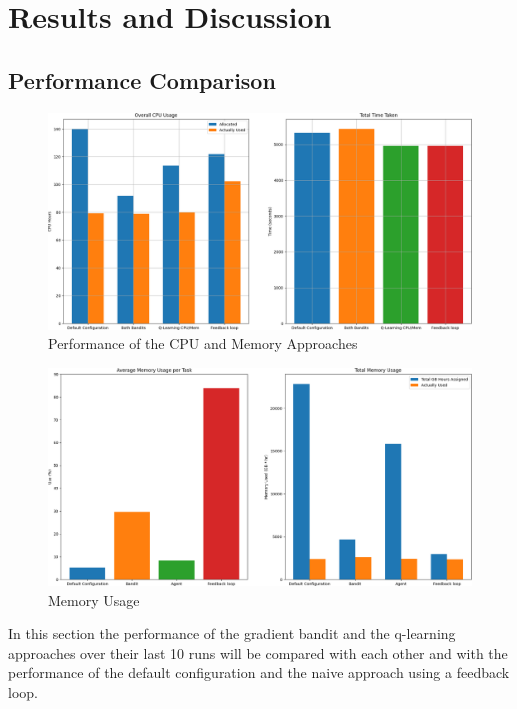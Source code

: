 \section{Results and Discussion}
\label{sec:analysis}

\subsection{Performance Comparison}
\label{sub:comp_perf}

\begin{figure}[h]
    \centering
        \includegraphics[width=\textwidth]{fig/cpu_mem_results.png}
        \caption{Performance of the CPU and Memory Approaches}
        \label{fig:cpu_results}
\end{figure}

\begin{figure}[ht]
    \centering
        \includegraphics[width=\textwidth]{fig/cropped_memory_usage_final.png}
        \caption{Memory Usage}
        \label{fig:mem_use}
\end{figure}

In this section the performance of the gradient bandit and the q-learning approaches over their last 10 runs will be compared with each other and with the performance of the default configuration and the naive approach using a feedback loop.

